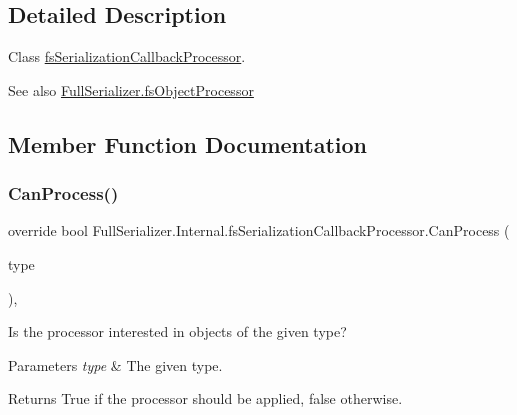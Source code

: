 \subsection{Detailed Description}
Class \hyperlink{class_full_serializer_1_1_internal_1_1fs_serialization_callback_processor}{fs\+Serialization\+Callback\+Processor}. 

\begin{DoxySeeAlso}{See also}
\hyperlink{class_full_serializer_1_1fs_object_processor}{Full\+Serializer.\+fs\+Object\+Processor}


\end{DoxySeeAlso}


\subsection{Member Function Documentation}
\mbox{\label{class_full_serializer_1_1_internal_1_1fs_serialization_callback_processor_a78a0e22235867c360c341f0772d506a1}} 
\subsubsection{\texorpdfstring{Can\+Process()}{CanProcess()}}
{\footnotesize\ttfamily override bool Full\+Serializer.\+Internal.\+fs\+Serialization\+Callback\+Processor.\+Can\+Process (\begin{DoxyParamCaption}\item[{Type}]{type }\end{DoxyParamCaption})\hspace{0.3cm}{\ttfamily [inline]}, {\ttfamily [virtual]}}



Is the processor interested in objects of the given type? 


\begin{DoxyParams}{Parameters}
{\em type} & The given type.\\
\hline
\end{DoxyParams}
\begin{DoxyReturn}{Returns}
True if the processor should be applied, false otherwise.
\end{DoxyReturn}


